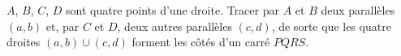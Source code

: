 $A$, $B$, $C$, $D$ sont quatre points d'une droite. Tracer par $A$ et $B$ deux parallèles $(a, b)$ et, par $C$ et $D$, deux autres parallèles $(c, d)$, de sorte que les quatre droites $(a, b) \cup (c, d)$ forment les côtés d'un carré $PQRS$.
